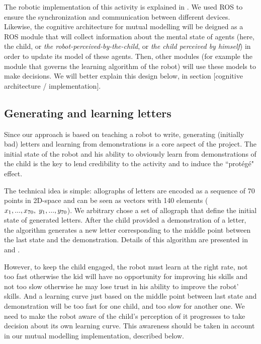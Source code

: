 \documentclass[10pt,a4paper]{article}
\begin{document}
The robotic implementation of this activity is explained in \cite{Hood}. We used ROS to ensure the synchronization and communication between different devices. Likewise, the cognitive architecture for mutual modelling will be deigned as a ROS module that will collect information about the mental state of agents (here, the child, or \textit{the robot-perceived-by-the-child}, or \textit{the child perceived by himself}) in order to update its model of these agents. Then, other modules (for example the module that governs the learning algorithm of the robot) will use these models to make decisions. We will better explain this design below, in section [cognitive architecture / implementation].

\subsection{Generating and learning letters}

Since our approach is based on teaching a robot to write, generating (initially
bad) letters and learning from demonstrations is a core aspect of the project.
The initial state of the robot and his ability to obviously learn from demonstrations of the child is the key to lend credibility to the activity and to induce the ``prot\'eg\'e" effect.

The technical idea is simple: allographs of letters are encoded as a sequence of 70 points in
2D-space and can be seen as vectors with 140 elements
($x_1,...,x_{70},\hspace{1mm}y_1,...,y_{70}$). We arbitrary chose a set of allograph
that define the initial state of generated letters. 
After the child provided a demonstration of a letter, the algorithm
generates a new letter corresponding to the middle point between the last state and the
demonstration. Details of this algorithm are presented in \cite{Hood} and \cite{jacq2016building}.

However, to keep the child engaged, the robot must learn at the right rate, not too fast otherwise the kid will have
no opportunity for improving his skills and not too slow otherwise he may lose
trust in his ability to improve the robot' skills. And a learning curve just based on the middle point between last state and demonstration will be too fast for one child, and too slow for another one. We need to make the robot aware of the child's perception of it progresses to take decision about its own learning curve. This awareness should be taken in account in our mutual modelling implementation, described below. 
\end{document}
